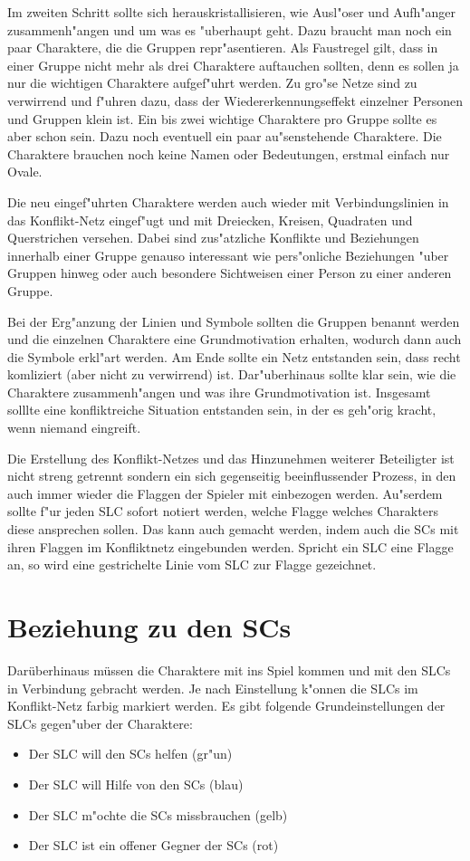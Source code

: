 Im zweiten Schritt sollte sich herauskristallisieren, wie Ausl"oser und Aufh"anger zusammenh"angen und um was es "uberhaupt geht. Dazu braucht man noch ein paar Charaktere, die die Gruppen repr"asentieren. Als Faustregel gilt, dass in einer Gruppe nicht mehr als drei Charaktere auftauchen sollten, denn es sollen ja nur die wichtigen Charaktere aufgef"uhrt werden. Zu gro"se Netze sind zu verwirrend und f"uhren dazu, dass der Wiedererkennungseffekt einzelner Personen und Gruppen klein ist. Ein bis zwei wichtige Charaktere pro Gruppe sollte es aber schon sein. Dazu noch eventuell ein paar au"senstehende Charaktere. Die Charaktere brauchen noch keine Namen oder Bedeutungen, erstmal einfach nur Ovale.

Die neu eingef"uhrten Charaktere werden auch wieder mit Verbindungslinien in das Konflikt-Netz eingef"ugt und mit Dreiecken, Kreisen, Quadraten und Querstrichen versehen. Dabei sind zus"atzliche Konflikte und Beziehungen innerhalb einer Gruppe genauso interessant wie pers"onliche Beziehungen "uber Gruppen hinweg oder auch besondere Sichtweisen einer Person zu einer anderen Gruppe.

Bei der Erg"anzung der Linien und Symbole sollten die Gruppen benannt werden und die einzelnen Charaktere eine Grundmotivation erhalten, wodurch dann auch die Symbole erkl"art werden. Am Ende sollte ein Netz entstanden sein, dass recht komliziert (aber nicht zu verwirrend) ist. Dar"uberhinaus sollte klar sein, wie die Charaktere zusammenh"angen und was ihre Grundmotivation ist. Insgesamt solllte eine konfliktreiche Situation entstanden sein, in der es geh"orig kracht, wenn niemand eingreift.

Die Erstellung des Konflikt-Netzes und das Hinzunehmen weiterer Beteiligter ist nicht streng getrennt sondern ein sich gegenseitig beeinflussender Prozess, in den auch immer wieder die Flaggen der Spieler mit einbezogen werden. Au"serdem sollte f"ur jeden SLC sofort notiert werden, welche Flagge welches Charakters diese ansprechen sollen. Das kann auch gemacht werden, indem auch die SCs mit ihren Flaggen im Konfliktnetz eingebunden werden. Spricht ein SLC eine Flagge an, so wird eine gestrichelte Linie vom SLC zur Flagge gezeichnet.




\section{Beziehung zu den SCs}
Darüberhinaus müssen die Charaktere mit ins Spiel kommen und mit den SLCs in Verbindung gebracht werden. Je nach Einstellung k"onnen die SLCs im Konflikt-Netz farbig markiert werden. Es gibt folgende Grundeinstellungen der SLCs gegen"uber der Charaktere:
\begin{itemize}
  \item Der SLC will den SCs helfen (gr"un)
  \item Der SLC will Hilfe von den SCs (blau)
  \item Der SLC m"ochte die SCs missbrauchen (gelb)
  \item Der SLC ist ein offener Gegner der SCs (rot)
\end{itemize}


